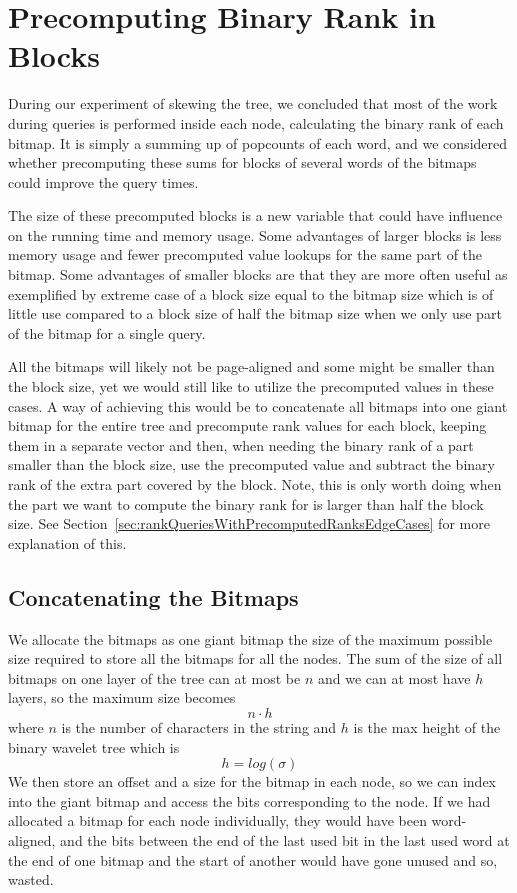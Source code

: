 \section{Precomputing Binary Rank in Blocks}
During our experiment of skewing the tree, we concluded that most of the work during queries is performed inside each node, calculating the binary rank of each bitmap.
It is simply a summing up of popcounts of each word, and we considered whether precomputing these sums for blocks of several words of the bitmaps could improve the query times.

The size of these precomputed blocks is a new variable that could have influence on the running time and memory usage.
Some advantages of larger blocks is less memory usage and fewer precomputed value lookups for the same part of the bitmap.
Some advantages of smaller blocks are that they are more often useful as exemplified by extreme case of a block size equal to the bitmap size which is of little use compared to a block size of half the bitmap size when we only use part of the bitmap for a single query.

All the bitmaps will likely not be page-aligned and some might be smaller than the block size, yet we would still like to utilize the precomputed values in these cases.
A way of achieving this would be to concatenate all bitmaps into one giant bitmap for the entire tree and precompute rank values for each block, keeping them in a separate vector and then, when needing the binary rank of a part smaller than the block size, use the precomputed value and subtract the binary rank of the extra part covered by the block.
Note, this is only worth doing when the part we want to compute the binary rank for is larger than half the block size.
See Section~\ref{sec:rankQueriesWithPrecomputedRanksEdgeCases} for more explanation of this.




\subsection{Concatenating the Bitmaps}
We allocate the bitmaps as one giant bitmap the size of the maximum possible size required to store all the bitmaps for all the nodes. The sum of the size of all bitmaps on one layer of the tree can at most be $n$ and we can at most have $h$ layers, so the maximum size becomes
\[n \cdot h\]
where $n$ is the number of characters in the string and $h$ is the max height of the binary wavelet tree which is
\[ h = log(\sigma) \]
We then store an offset and a size for the bitmap in each node, so we can index into the giant bitmap and access the bits corresponding to the node. 
If we had allocated a bitmap for each node individually, they would have been word-aligned, and the bits between the end of the last used bit in the last used word at the end of one bitmap and the start of another would have gone unused and so, wasted.

